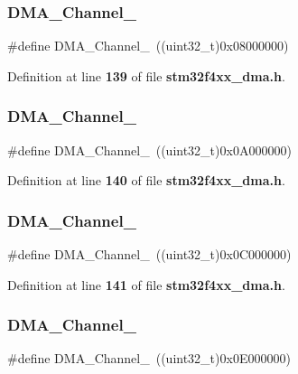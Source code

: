 \subsubsection{D\+M\+A\+\_\+\+Channel\+\_}
{\footnotesize\ttfamily \#define D\+M\+A\+\_\+\+Channel\+\_~((uint32\+\_\+t)0x08000000)}



Definition at line \textbf{ 139} of file \textbf{ stm32f4xx\+\_\+dma.\+h}.

\mbox{\label{group__DMA__channel_gae3dd5d28def40846aea8e3013d63311b}} 
\subsubsection{D\+M\+A\+\_\+\+Channel\+\_}
{\footnotesize\ttfamily \#define D\+M\+A\+\_\+\+Channel\+\_~((uint32\+\_\+t)0x0\+A000000)}



Definition at line \textbf{ 140} of file \textbf{ stm32f4xx\+\_\+dma.\+h}.

\mbox{\label{group__DMA__channel_ga141e89570dabba4f778e8e8df80e7812}} 
\subsubsection{D\+M\+A\+\_\+\+Channel\+\_}
{\footnotesize\ttfamily \#define D\+M\+A\+\_\+\+Channel\+\_~((uint32\+\_\+t)0x0\+C000000)}



Definition at line \textbf{ 141} of file \textbf{ stm32f4xx\+\_\+dma.\+h}.

\mbox{\label{group__DMA__channel_ga14f1265827ce49dad5075986118cc542}} 
\subsubsection{D\+M\+A\+\_\+\+Channel\+\_}
{\footnotesize\ttfamily \#define D\+M\+A\+\_\+\+Channel\+\_~((uint32\+\_\+t)0x0\+E000000)}



